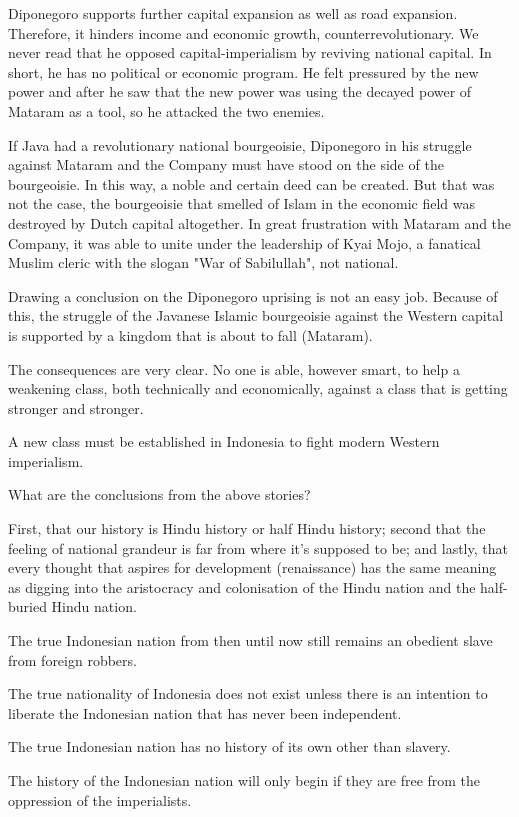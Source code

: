 Diponegoro supports further capital expansion as well as road expansion. Therefore, 
it hinders income and economic growth, counterrevolutionary. We never read that he 
opposed capital-imperialism by reviving national capital. In short, he has no political 
or economic program. He felt pressured by the new power and after he saw that the new power 
was using the decayed power of Mataram as a tool, so he attacked the two enemies.\nline

If Java had a revolutionary national bourgeoisie, Diponegoro in his struggle against 
Mataram and the Company must have stood on the side of the bourgeoisie. In this way, 
a noble and certain deed can be created. But that was not the case, the bourgeoisie 
that smelled of Islam in the economic field was destroyed by Dutch capital altogether. 
In great frustration with Mataram and the Company, it was able to unite under the 
leadership of Kyai Mojo, a fanatical Muslim cleric with the slogan "War of Sabilullah", not national.\nline

Drawing a conclusion on the Diponegoro uprising is not an easy job. Because of this, 
the struggle of the Javanese Islamic bourgeoisie against the Western capital is supported 
by a kingdom that is about to fall (Mataram).\nline

The consequences are very clear. No one is able, however smart, to help 
a weakening class, both technically and economically, against a class that is getting stronger and stronger.\nline

A new class must be established in Indonesia to fight modern Western imperialism.\nline

What are the conclusions from the above stories?\nline

First, that our history is Hindu history or half Hindu history; second 
that the feeling of national grandeur is far from where it's supposed to be; and 
lastly, that every thought that aspires for development (renaissance) has the same 
meaning as digging into the aristocracy and colonisation of the Hindu nation and the half-buried Hindu nation.\nline

The true Indonesian nation from then until now still remains an obedient slave from foreign robbers.\nline

The true nationality of Indonesia does not exist unless there is an intention to liberate the Indonesian nation that has never been independent.\nline

The true Indonesian nation has no history of its own other than slavery.\nline

The history of the Indonesian nation will only begin if they are free from the oppression of the imperialists.